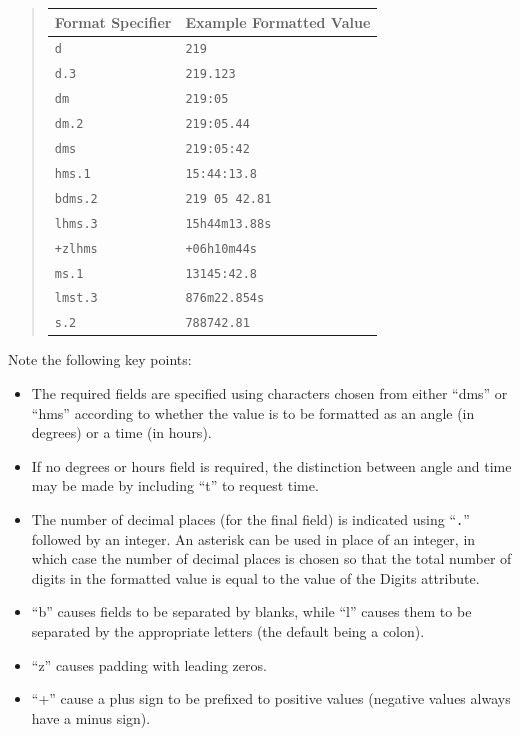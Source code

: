 \documentclass[twoside,11pt]{article}
\begin{document}
\begin{quote}
\begin{center}
\begin{tabular}{|l|l|}
\hline
{\bf{Format Specifier}} & {\bf{Example Formatted Value}}\\
\hline \hline
{\tt{d}} & {\tt{219}}\\
{\tt{d.3}} & {\tt{219.123}}\\
{\tt{dm}} & {\tt{219:05}}\\
{\tt{dm.2}} & {\tt{219:05.44}}\\
{\tt{dms}} & {\tt{219:05:42}}\\
{\tt{hms.1}} & {\tt{15:44:13.8}}\\
{\tt{bdms.2}} & {\tt{219 05 42.81}}\\
{\tt{lhms.3}} & {\tt{15h44m13.88s}}\\
{\tt{+zlhms}} & {\tt{+06h10m44s}}\\
{\tt{ms.1}} & {\tt{13145:42.8}}\\
{\tt{lmst.3}} & {\tt{876m22.854s}}\\
{\tt{s.2}} & {\tt{788742.81}}\\
\hline
\end{tabular}
\end{center}
\end{quote}

Note the following key points:

\begin{itemize}
\item The required fields are specified using characters chosen from
either ``dms'' or ``hms'' according to whether the value is to be
formatted as an angle (in degrees) or a time (in hours).

\item If no degrees or hours field is required, the distinction
between angle and time may be made by including ``t'' to request time.

\item The number of decimal places (for the final field) is indicated
using ``{\tt{.}}'' followed by an integer. An asterisk can be used in
place of an integer, in which case the number of decimal places is 
chosen so that the total number of digits in the formatted value is equal 
to the value of the Digits attribute.

\item ``b'' causes fields to be separated by blanks, while ``l''
causes them to be separated by the appropriate letters (the default
being a colon).

\item ``z'' causes padding with leading zeros.

\item ``+'' cause a plus sign to be prefixed to positive values
(negative values always have a minus sign).
\end{itemize}
\end{document}
